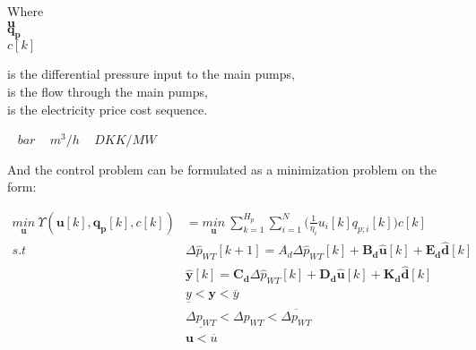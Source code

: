 \begin{minipage}[t]{0.20\textwidth}
Where\\
\hspace*{8mm} $\pmb{u}$ \\
\hspace*{8mm} $\pmb{q_p}$ \\
\hspace*{8mm} $c[k]$ 
\end{minipage}
\begin{minipage}[t]{0.68\textwidth}
\vspace*{2mm}
is the differential pressure input to the main pumps,\\
is the flow through the main pumps,\\
is the electricity price cost sequence.
\end{minipage}
\begin{minipage}[t]{0.10\textwidth}
\vspace*{2mm}
\textcolor{White}{te}$\unit{bar}$
\textcolor{White}{te}$\unit{m^3/h}$
\textcolor{White}{te}$\unit{DKK/MW}$
\end{minipage}

And the control problem can be formulated as a minimization problem on the form:

\begin{align}
\underset{\pmb{u}}{min} \:  \Upsilon(\pmb{u}[k],\pmb{q_p}[k],c[k]) &= \underset{\pmb{u}}{min} \: \sum_{k=1}^{H_p} \sum_{i=1}^{N} \Big(\frac{1}{\eta_i} u_i[k]  q_{p;i}[k]\Big) c[k] \label{eqcost1} \\
%
s.t \:\:\:\:\: & \Delta \hat{p}_{WT} [k+1] = A_d \Delta \hat{p}_{WT}[k]  + \pmb{B_d} \pmb{\hat{u}}[k] + \pmb{E_d} \pmb{\hat{d}}[k]  \\
%
&\pmb{\hat{y}}[k] = \pmb{C_d} \Delta \hat{p}_{WT}[k] + \pmb{D_d} \pmb{\hat{u}}[k] + \pmb{K_d} \pmb{\hat{d}}[k] \\
%
& \underline{y} < \pmb{y} < \overline{y} \\
%
& \underline{\Delta p_{WT}} < \Delta p_{WT} < \overline{\Delta p_{WT}} \\
%
& \pmb{u} < \overline{u} \label{eqconst2} 
\end{align}

